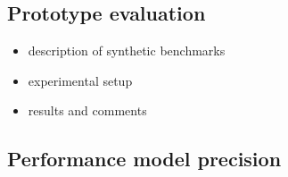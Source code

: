 
\subsection{Prototype evaluation}

\begin{itemize}
\item description of synthetic benchmarks
\item experimental setup
\item results and comments
\end{itemize}

\subsection{Performance model precision}


